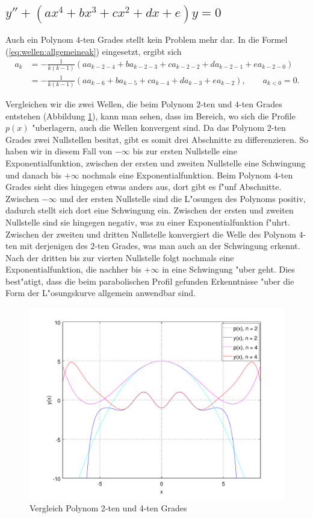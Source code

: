 \subsection{\texorpdfstring{$y''+(ax^4+bx^3+cx^2+dx+e)y = 
0$}{y''-(ax4+bx3+cx2+dx+e)y = 0}}

Auch ein Polynom $4$-ten Grades stellt kein Problem mehr dar. In die 
Formel (\ref{eq:wellen:allgemeineak}) eingesetzt, ergibt sich
\begin{equation*}
	\begin{split}
		a_k &= -\frac{1}{k(k-1)} (aa_{k-2-4} + 
		ba_{k-2-3} + ca_{k-2-2} + da_{k-2-1} +ea_{k-2-0})
		\\
		&= -\frac{1}{k(k-1)} (aa_{k-6} + ba_{k-5} + 
		ca_{k-4} + da_{k-3} +ea_{k-2}), \qquad a_{k<0} = 0.
	\end{split}
\end{equation*}

Vergleichen wir die zwei Wellen, die beim Polynom $2$-ten und $4$-ten Grades 
entstehen (Abbildung \ref{fig:wellen:poly4-dgl}), kann man sehen, 
dass im Bereich, wo sich die Profile $p(x)$ "uberlagern, auch die Wellen 
konvergent sind. Da das Polynom $2$-ten Grades zwei Nullstellen besitzt, gibt 
es somit drei Abschnitte zu differenzieren. So haben wir in diesem Fall von 
$-\infty$ bis zur ersten Nullstelle eine Exponentialfunktion, zwischen der 
ersten und zweiten Nullstelle eine Schwingung und danach bis $+\infty$ nochmals 
eine Exponentialfunktion. Beim Polynom $4$-ten Grades sieht dies hingegen etwas 
anders aus, dort gibt es f"unf Abschnitte. Zwischen $-\infty$ und der ersten 
Nullstelle sind die L"osungen des Polynoms positiv, dadurch stellt sich dort 
eine Schwingung ein. Zwischen der ersten und zweiten Nullstelle sind sie 
hingegen negativ, was zu einer Exponentialfunktion f"uhrt. Zwischen der zweiten 
und dritten Nullstelle konvergiert die Welle des Polynom $4$-ten mit derjenigen 
des $2$-ten Grades, was man auch an der Schwingung erkennt. Nach der dritten 
bis zur vierten Nullstelle folgt nochmals eine Exponentialfunktion, die nachher 
bis $+\infty$ in eine Schwingung "uber geht. Dies best"atigt, dass die beim 
parabolischen Profil gefunden Erkenntnisse "uber die Form der L"osungskurve 
allgemein anwendbar sind.

\begin{figure}
	\includegraphics[width=1\hsize]{./wellen/images/allgemein/n4.pdf}
	\caption{Vergleich Polynom 2-ten und 4-ten Grades}
	\label{fig:wellen:poly4-dgl}
\end{figure}
